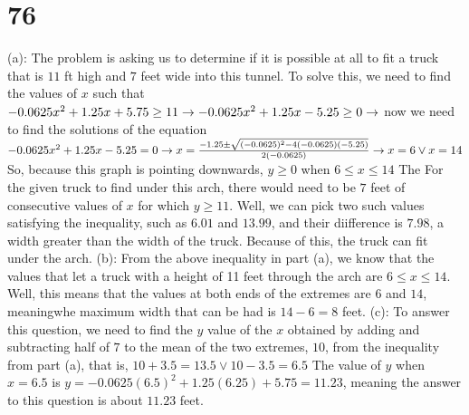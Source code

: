 \documentclass{article}
\theoremstyle{definition}
\begin{document}
\section*{76}
(a): The problem is asking us to determine if it is possible at all to fit a truck that is $11$ ft high and $7$ feet wide into this tunnel. To solve this, 
we need to find the values of $x$ such that $-0.0625x^2+1.25x+5.75\ge 11\newline\rightarrow 
-0.0625x^2+1.25x-5.25\ge 0\newline\rightarrow$ now we need to find the solutions of the equation $-0.0625x^2+1.25x-5.25=0\newline\rightarrow 
x=\frac{-1.25\pm\sqrt{(-0.0625)^2-4(-0.0625)(-5.25)}}{2(-0.0625)}\newline\rightarrow 
x=6\vee x=14\newline$ So, because this graph is pointing downwards, $y\ge 0$ when $6\le x\le 14$ The For the given truck to find under this arch, 
there would need to be $7$ feet of consecutive values of $x$ for which $y\ge 11$. Well, we can pick two such values satisfying the inequality, such as 
$6.01$ and $13.99$, and their diifference is $7.98$, a width greater than the width of the truck. Because of this, the truck can fit under the arch.\newline
(b): From the above inequality in part (a), we know that the values that let a truck with a height of 11 feet through the arch are $6\le x\le 14$. Well, 
this means that the values at both ends of the extremes are $6$ and $14$, meaningwhe maximum width that can be had is $14-6=8$ feet.
(c): To answer this question, we need to find the $y$ value of the $x$ obtained by adding and subtracting 
half of $7$ to the mean of the two extremes, $10$, from the  
inequality from part (a), that is, $10+3.5=13.5\vee 10-3.5=6.5$ The value of $y$ when $x=6.5$ is $y=-0.0625(6.5)^2+1.25(6.25)+5.75=11.23$, meaning the 
answer to this question is about $11.23$ feet.
\end{document}
